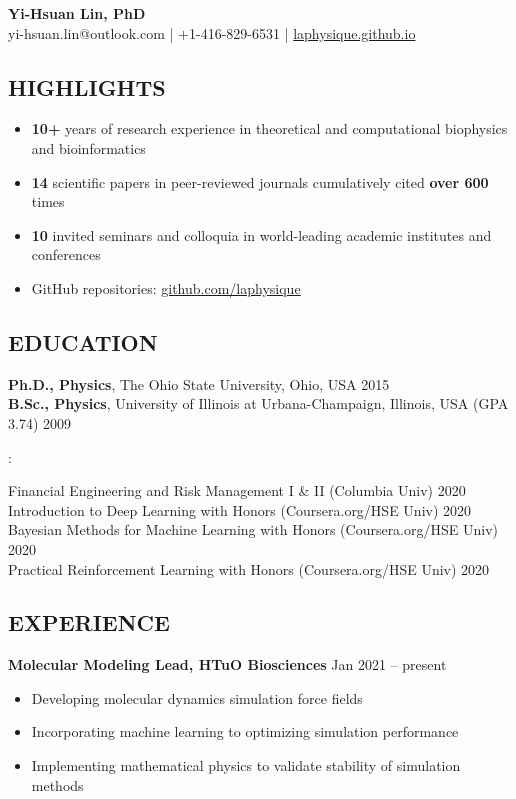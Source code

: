 \documentclass[11pt,letterpaper, sans]{article}
\makeatletter
\newcommand{\newsec}[1]{\subsection*{\hspace{-1.5pt}\uppercase{#1}}}
\newcommand{\newsubsec}[1]{\vspace{0.2cm}{\bf #1}\vspace{0.1cm}}
\def\name{Yi-Hsuan Lin, PhD}
\def\header{
\begin{center}
{\LARGE\bf \name} \vspace{0.3cm} \\
yi-hsuan.lin@outlook.com
| $+$1-416-829-6531 | 
\href{https://laphysique.github.io}{laphysique.github.io}
\end{center}
}
\makeatother
\begin{document}
\header

\begin{flushleft}



\newsec{Highlights}

\begin{itemize}[leftmargin=*]\itemsep-0.2em
\item {\bf 10+} years of research experience in theoretical and computational biophysics and bioinformatics
\item {\bf 14} scientific papers in peer-reviewed journals
cumulatively cited {\bf over 600} times
\item {\bf 10} invited seminars and colloquia in world-leading academic institutes and conferences
\item GitHub repositories: \href{https://github.com/laphysique}{github.com/laphysique} 
\end{itemize}

\newsec{Education}

{\bf Ph.D., Physics}, The Ohio State University, Ohio, USA \hfill 2015 \\
{\bf B.Sc., Physics}, University of Illinois at Urbana-Champaign, Illinois, USA (GPA 3.74) \hfill 2009

\newsubsec{Certificates}: 

Financial Engineering and Risk Management I \& II (Columbia Univ) \hfill 2020 \\
Introduction to Deep Learning with Honors (Coursera.org/HSE Univ)  \hfill 2020 \\
Bayesian Methods for Machine Learning with Honors (Coursera.org/HSE Univ)  \hfill 2020 \\
Practical Reinforcement Learning with Honors (Coursera.org/HSE Univ)  \hfill 2020 \\

\newsec{Experience}

{\bf Molecular Modeling Lead,
HTuO Biosciences} 
\hfill Jan 2021 -- present
\vspace{-0.5em} \\
\begin{itemize}[leftmargin=*]\itemsep-0.1em
\item Developing molecular dynamics simulation force fields
\item Incorporating machine learning to optimizing simulation performance
\item Implementing mathematical physics to validate stability of simulation methods
\end{itemize}


\end{flushleft}
\end{document}
